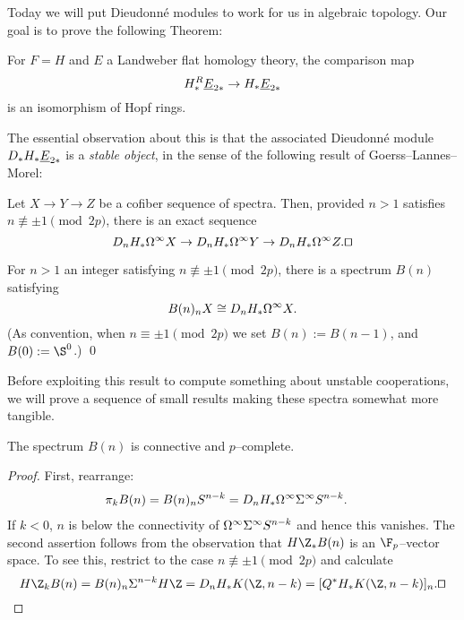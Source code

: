 Today we will put Dieudonn\'e modules to work for us in algebraic topology.  Our goal is to prove the following Theorem:
\begin{theorem}
For $F = H$ and $E$ a Landweber flat homology theory, the comparison map \[H_*^R \underline{\smash{E}}_{2*} \to H_* \underline{\smash{E}}_{2*}\] is an isomorphism of Hopf rings.
\end{theorem}

\noindent The essential observation about this is that the associated Dieudonn\'e module $D_* H_* \underline{\smash{E}}_{2*}$ is a \emph{stable object}, in the sense of the following result of Goerss--Lannes--Morel:

\begin{theorem}
Let $X \to Y \to Z$ be a cofiber sequence of spectra.  Then, provided $n > 1$ satisfies $n \not\equiv \pm 1 \pmod{2p}$, there is an exact sequence \[D_n H_* \Loops^\infty X \to D_n H_* \Loops^\infty Y \to D_n H_* \Loops^\infty Z. \qed\]
\end{theorem}

\begin{corollary}
For $n > 1$ an integer satisfying $n \not\equiv \pm 1 \pmod{2p}$, there is a spectrum $B(n)$ satisfying \[B(n)_n X \cong D_n H_* \Omega^\infty X.\] (As convention, when $n \equiv \pm 1 \pmod{2p}$ we set $B(n) := B(n-1)$, and $B(0) := \S^0$.)   \qed
\end{corollary}

Before exploiting this result to compute something about unstable cooperations, we will prove a sequence of small results making these spectra somewhat more tangible.

\begin{lemma}
The spectrum $B(n)$ is connective and $p$--complete.
\end{lemma}
\begin{proof}
First, rearrange:
\begin{align*}
\pi_k B(n) & = B(n)_n S^{n-k} = D_n H_* \Omega^\infty \Sigma^\infty S^{n-k}.
\end{align*}
If $k < 0$, $n$ is below the connectivity of $\Omega^\infty \Sigma^\infty S^{n-k}$ and hence this vanishes.  The second assertion follows from the observation that $H\Z_* B(n)$ is an $\F_p$--vector space.  To see this, restrict to the case $n \not\equiv \pm 1 \pmod{2p}$ and calculate \[H\Z_k B(n) = B(n)_n \Susp^{n-k} H\Z = D_n H_* K(\Z, n-k) = [Q^* H_* K(\Z, n-k)]_n. \qed\]
\end{proof}

